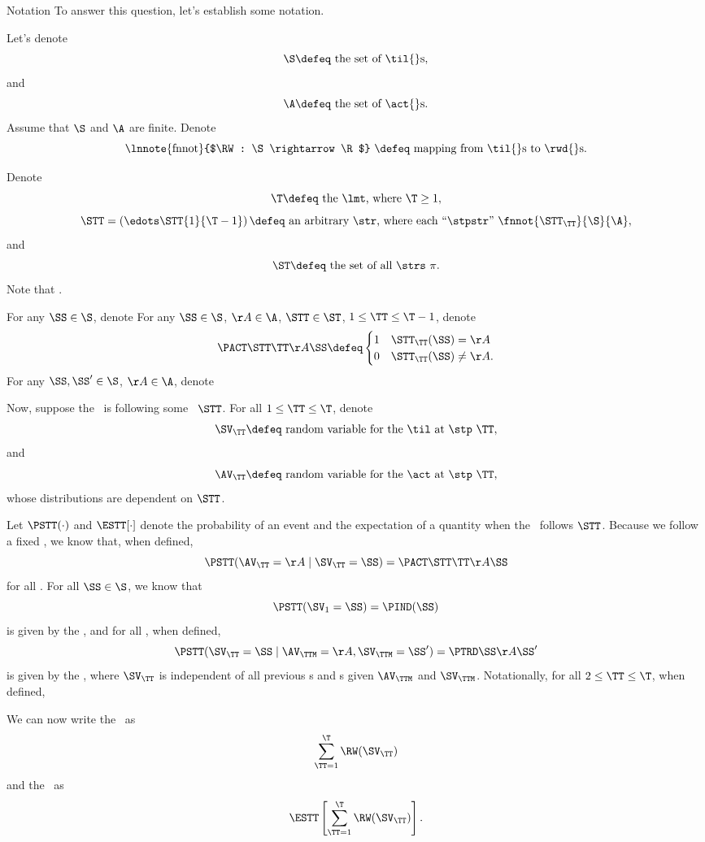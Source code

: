 \begin{part}{Notation}
  To answer this question, let's establish some notation.

  Let's denote
  $$\text{$\S \defeq$ the set of \til{}s},$$
  and 
  $$\text{$\A \defeq$ the set of \act{}s.}$$
  Assume that $\S$ and $\A$ are finite.
  Denote
  $$\text{\lnnote{fnnot}{$\RW : \S \rightarrow \R$} $\defeq$ mapping from \til{}s to \rwd{}s.}$$

  Denote
  $$\text{$\T \defeq$ the \lmt, where $\T \ge 1$},$$
  $$\text{$\STT = \left(\edots\STT{1}{\T - 1}\right) \defeq$ an arbitrary \str, 
  where each ``\stpstr'' {$\fnnot{\STT_\TT}{\S}{\A}$}},$$
  and
  $$\text{$\ST \defeq$ the set of all \strs\ $\pi$}.$$
  Note that .

  For any $\SS \in \S$, denote
  For any $\SS \in \S$, $\AA \in \A$, $\STT \in \ST$, $1 \le \TT \le \T - 1$, denote
  $$\PACT\STT\TT\AA\SS\defeq 
    \begin{cases}
      1 & \STT_\TT(\SS) = \AA\\
      0 & \STT_\TT(\SS) \ne \AA.\\
    \end{cases}
  $$
  For any $\SS,\SS' \in \S$, $\AA \in \A$, denote

  Now, suppose the \agt\ is following some \str\ $\STT$.
  For all $1 \le \TT \le \T$,
  denote
  $$\text{$\SV_\TT \defeq$ random variable for the \til\ at \stp\ $\TT$},$$
  and
  $$\text{$\AV_\TT \defeq$ random variable for the \act\ at \stp\ $\TT$},$$
  whose distributions are dependent on $\STT$.

  Let $\PSTT(\cdot)$ and $\ESTT[\cdot]$ denote the probability of an event
  and the expectation of a quantity
  when the \agt\ follows $\STT$.
  Because we follow a fixed \str, we know that, when defined,
  $$\PSTT(\AV_\TT = \AA \mid \SV_\TT = \SS) = \PACT\STT\TT\AA\SS$$
  for all
  \rchreqarng.
  For all $\SS \in \S$, we know that
  $$\PSTT(\SV_1 = \SS) = \PIND(\SS)$$
  is given by the \ind, and
  for all \rchreqsrng, when defined,
  $$
  \PSTT(\SV_\TT = \SS \mid \AV_\TTM = \AA, \SV_\TTM = \SS') =
  \PTRD\SS\AA{\SS'}
  $$
  is given by the \trd, where
  $\SV_\TT$ is independent of all previous \til{}s and \act{}s given $\AV_\TTM$ and $\SV_\TTM$.
  Notationally, for all $2 \le \TT \le \T$, when defined,

  We can now write the \trwd\ as
  $$\sum_{\TT = 1}^\T \RW(\SV_\TT)$$
  and the \atrwd\ as
  $$\ESTT\left[\sum_{\TT = 1}^\T \RW(\SV_\TT)\right].$$
\end{part}
